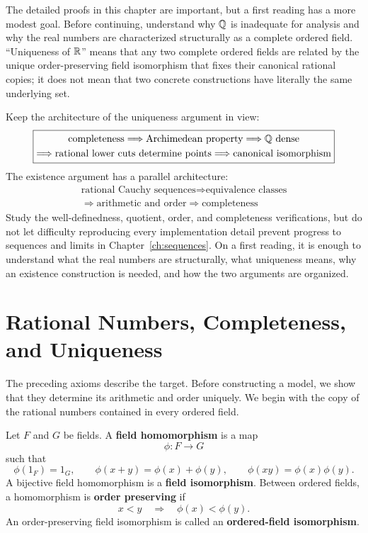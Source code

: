 \begin{remark}
The detailed proofs in this chapter are important, but a first reading has
a more modest goal. Before continuing, understand why \(\mathbb{Q}\) is inadequate
for analysis and why the real numbers are characterized structurally as a
complete ordered field. ``Uniqueness of \(\mathbb{R}\)'' means that any two complete
ordered fields are related by the unique order-preserving field isomorphism
that fixes their canonical rational copies; it does not mean that two
concrete constructions have literally the same underlying set.

Keep the architecture of the uniqueness argument in view:
\[
\boxed{
\begin{gathered}
\text{completeness}
\Longrightarrow
\text{Archimedean property}
\Longrightarrow
\mathbb{Q}\text{ dense}\\
\Longrightarrow
\text{rational lower cuts determine points}
\Longrightarrow
\text{canonical isomorphism}
\end{gathered}}
\]
The existence argument has a parallel architecture:
\[
\boxed{
\begin{gathered}
\text{rational Cauchy sequences}
\Longrightarrow
\text{equivalence classes}\\
\Longrightarrow
\text{arithmetic and order}
\Longrightarrow
\text{completeness}
\end{gathered}}
\]
Study the well-definedness, quotient, order, and completeness verifications,
but do not let difficulty reproducing every implementation detail prevent
progress to sequences and limits in Chapter~\ref{ch:sequences}. On a first
reading, it is enough to understand what the real numbers are structurally,
what uniqueness means, why an existence construction is needed, and how the
two arguments are organized.
\end{remark}

\section{Rational Numbers, Completeness, and Uniqueness}

The preceding axioms describe the target.  Before constructing a model, we
show that they determine its arithmetic and order uniquely. We begin with
the copy of the rational numbers contained in every ordered field.

\begin{definition}
Let \(F\) and \(G\) be fields.  A \textbf{field homomorphism} is a map
\[
\phi:F\longrightarrow G
\]
such that
\[
\phi(1_F)=1_G,\qquad
\phi(x+y)=\phi(x)+\phi(y),\qquad
\phi(xy)=\phi(x)\phi(y).
\]
A bijective field homomorphism is a \textbf{field isomorphism}.  Between
ordered fields, a homomorphism is \textbf{order preserving} if
\[
x<y\quad\Longrightarrow\quad\phi(x)<\phi(y).
\]
An order-preserving field isomorphism is called an \textbf{ordered-field
isomorphism}.
\end{definition}

